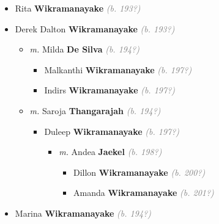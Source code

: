 \documentclass[10pt, openany]{book}
\begin{document}
\begin{itemize}
{\begin{itemize}
{\begin{itemize}
{\begin{itemize}
{ }
\item{Kamal \textbf{Wikramanayake} \textcolor{gray}{\textit{(b. 196?)}}
 }
\end{itemize}}
\end{itemize}
 }
\item{Rita \textbf{Wikramanayake} \textcolor{gray}{\textit{(b. 193?)}}
 }
\item{Derek Dalton \textbf{Wikramanayake} \textcolor{gray}{\textit{(b. 193?)}}
\begin{itemize}
\item{\textit{m.} Milda \textbf{De Silva} \textcolor{gray}{\textit{(b. 194?)}}   \label{couple:00003974:00003975} \begin{itemize}
\item{Malkanthi \textbf{Wikramanayake} \textcolor{gray}{\textit{(b. 197?)}}
 }
\item{Indirs \textbf{Wikramanayake} \textcolor{gray}{\textit{(b. 197?)}}
 }
\end{itemize}}
\item{\textit{m.} Saroja \textbf{Thangarajah} \textcolor{gray}{\textit{(b. 194?)}}   \label{couple:00003974:00003978} \begin{itemize}
\item{Duleep \textbf{Wikramanayake} \textcolor{gray}{\textit{(b. 197?)}}
\begin{itemize}
\item{\textit{m.} Andea \textbf{Jaekel} \textcolor{gray}{\textit{(b. 198?)}}   \label{couple:00003979:00003980} \begin{itemize}
\item{Dillon \textbf{Wikramanayake} \textcolor{gray}{\textit{(b. 200?)}}
 }
\item{Amanda \textbf{Wikramanayake} \textcolor{gray}{\textit{(b. 201?)}}
 }
\end{itemize}}
\end{itemize}
 }
\end{itemize}}
\end{itemize}
  }
\item{Marina \textbf{Wikramanayake} \textcolor{gray}{\textit{(b. 194?)}}
 }
\end{itemize}}
\end{itemize}
   
\end{document}

